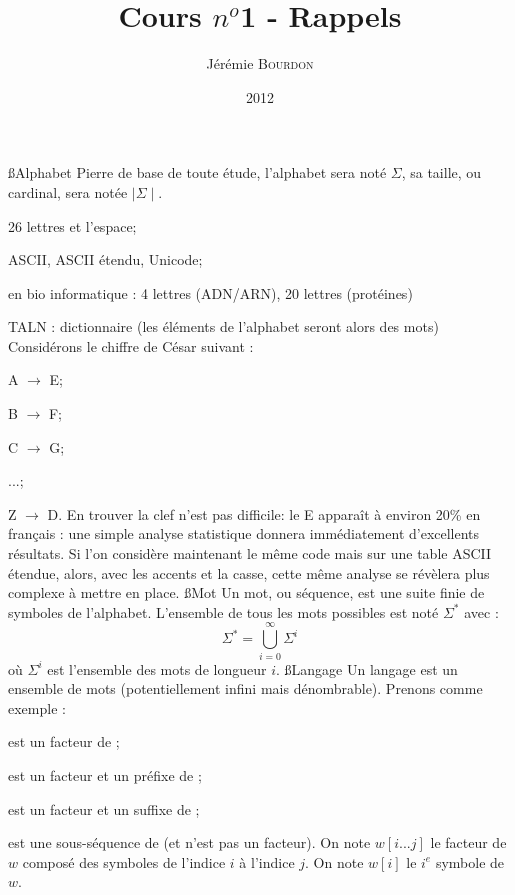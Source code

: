 \documentclass[a4paper,11pt]{article}
\begin{document}
\title{Cours $n^o$1 - Rappels}
\author{Jérémie \textsc{Bourdon}}
\date{2012}
\maketitle
{}
 \ss{Alphabet}
  \p Pierre de base de toute étude, l'alphabet sera noté $\Sigma$, sa
  taille, ou cardinal, sera notée $\mid\Sigma\mid$.
  \bi
   \item 26 lettres et l'espace;
   \item ASCII, ASCII étendu, Unicode;
   \item en bio informatique : 4 lettres (ADN/ARN), 20 lettres (protéines)
   \item TALN : dictionnaire (les éléments de l'alphabet seront alors des mots)
  \ei
  \p Considérons le chiffre de César suivant :\\
  \bi
   \item A $\rightarrow$ E;
   \item B $\rightarrow$ F;
   \item C $\rightarrow$ G;
   \item ...;
   \item Z $\rightarrow$ D.
  \ei
  \p En trouver la clef n'est pas difficile: le E apparaît à environ 20\%{} en
  français : une simple analyse statistique donnera immédiatement
  d'excellents résultats. Si l'on considère maintenant le même code mais sur une
  table ASCII étendue, alors, avec les accents et la casse, cette même analyse se
  révèlera plus complexe à mettre en place.
 \ss{Mot}
 \p Un mot, ou séquence, est une suite finie de symboles de l'alphabet. L'ensemble
 de tous les mots possibles est noté $\Sigma^*$ avec :
 \[
 \Sigma^* = \bigcup^{\infty}_{i = 0} \Sigma^i
 \]
 où $\Sigma^i$ est l'ensemble des mots de longueur $i$.
 \ss{Langage}
 \p Un langage est un ensemble de mots (potentiellement infini mais dénombrable).
 \p Prenons comme exemple  :\\
 \bi
  \item {} est un facteur de ;
  \item {} est un facteur et un préfixe de ;
  \item {} est un facteur et un suffixe de ;
  \item {} est une sous-séquence de  (et n'est pas un facteur).
 \ei
 \p On note $w[i...j]$ le facteur de $w$ composé des symboles de l'indice $i$ à
 l'indice $j$. On note $w[i]$ le $i^{e}$ symbole de $w$.
\end{document}
